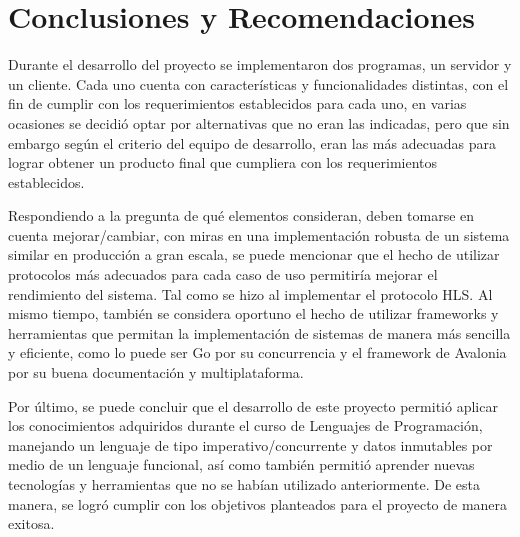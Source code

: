 \section{Conclusiones y Recomendaciones}

Durante el desarrollo del proyecto se implementaron dos programas, un servidor
y un cliente. Cada uno cuenta con características y funcionalidades distintas,
con el fin de cumplir con los requerimientos establecidos para cada uno, en varias 
ocasiones se decidió optar por alternativas que no eran las indicadas, pero que sin 
embargo según el criterio del equipo de desarrollo, eran las más adecuadas para
lograr obtener un producto final que cumpliera con los requerimientos establecidos.

Respondiendo a la pregunta de qué elementos consideran, deben tomarse en cuenta
mejorar/cambiar, con miras en una implementación robusta de un sistema similar
en producción a gran escala, se puede mencionar que el hecho de utilizar 
protocolos más adecuados para cada caso de uso permitiría mejorar el rendimiento
del sistema. Tal como se hizo al implementar el protocolo HLS. Al mismo tiempo, 
también se considera oportuno el hecho de utilizar frameworks y herramientas 
que permitan la implementación de sistemas de manera más sencilla y eficiente,
como lo puede ser Go por su concurrencia y el framework de Avalonia por 
su buena documentación y multiplataforma.

Por último, se puede concluir que el desarrollo de este proyecto permitió
aplicar los conocimientos adquiridos durante el curso de Lenguajes de
Programación, manejando un lenguaje de tipo imperativo/concurrente y datos 
inmutables por medio de un lenguaje funcional, así como también permitió
aprender nuevas tecnologías y herramientas que no se habían utilizado
anteriormente. De esta manera, se logró cumplir con los objetivos planteados
para el proyecto de manera exitosa.